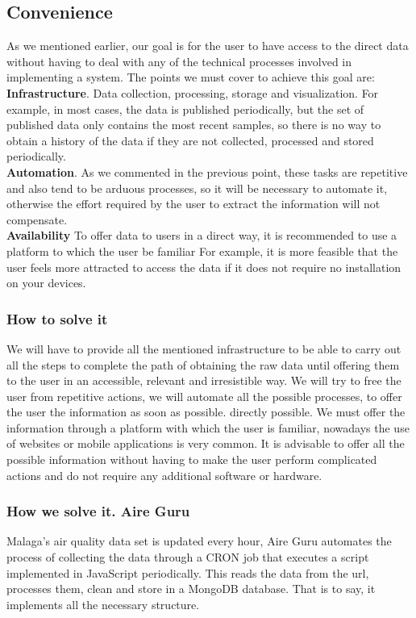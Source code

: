 \subsection{Convenience}
As we mentioned earlier, our goal is for the user to have access to the direct data without having to deal with any
of the technical processes involved in implementing a system. The points we must cover to achieve this goal are: \\

\textbf{Infrastructure}. Data collection, processing, storage and visualization. For example, in most cases, the data is
published periodically, but the set of published data only contains the most recent samples, so there is no way to obtain
a history of the data if they are not collected, processed and stored periodically. \\

\textbf{Automation}. As we commented in the previous point, these tasks are repetitive and also tend to be arduous processes, so it will be
necessary to automate it, otherwise the effort required by the user to extract the information will not compensate. \\

\textbf{Availability} To offer data to users in a direct way, it is recommended to use a platform to which the user
be familiar For example, it is more feasible that the user feels more attracted to access the data if it does not require
no installation on your devices. \\

\subsubsection{How to solve it} 
We will have to provide all the mentioned infrastructure to be able to carry out all the steps to complete the path of obtaining the
raw data until offering them to the user in an accessible, relevant and irresistible way.
We will try to free the user from repetitive actions, we will automate all the possible processes, to offer the user the information as soon as possible.
directly possible.
We must offer the information through a platform with which the user is familiar, nowadays the use of websites or mobile applications is very common.
It is advisable to offer all the possible information without having to make the user perform complicated actions and do not require any additional software or hardware.

\subsubsection{How we solve it. Aire Guru} 
Malaga's air quality data set is updated every hour, Aire Guru automates the process of collecting the
data through a CRON job that executes a script implemented in JavaScript periodically. This reads the data from the url, processes them,
clean and store in a MongoDB database. That is to say, it implements all the necessary structure.


